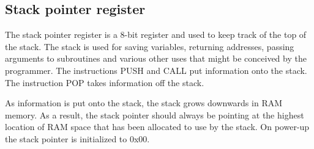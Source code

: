 \subsection{Stack pointer register}
\par \noindent The stack pointer register is a 8-bit register and used to keep track of the top of the stack. The stack is used for saving variables, returning 
addresses, passing arguments to subroutines and various other uses that might be conceived by the programmer. The instructions PUSH and CALL put 
information onto the stack. The instruction POP takes information off the stack. \bigskip

\par \noindent As information is put onto the stack, the stack grows downwards in RAM memory. As a result, the stack pointer should always be pointing at the highest
location of RAM space that has been allocated to use by the stack. On power-up the stack pointer is initialized to 0x00.